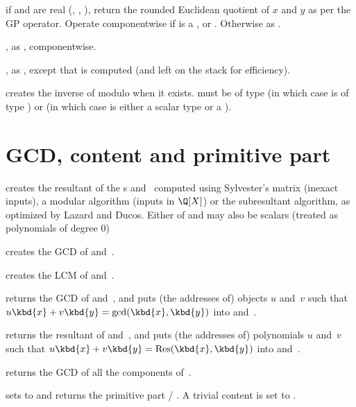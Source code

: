  if  and  are real
(, , ), return the rounded Euclidean quotient of
$x$ and $y$ as per the \kbd{\bs/} GP operator. Operate componentwise if
 is a ,  or . Otherwise as .

, as ,
componentwise.

, as , except that
 is computed (and left on the stack for efficiency).

 creates the inverse of  modulo 
when it exists.  must be of type  (in which case  is
of type ) or  (in which case  is either a scalar
type or a ).

\section{GCD, content and primitive part}


 creates the resultant of the s
 and~ computed using Sylvester's matrix (inexact inputs), a
modular algorithm (inputs in $\Q[X]$) or the subresultant algorithm, as
optimized by Lazard and Ducos. Either of  and  may also be
scalars (treated as polynomials of degree $0$)

 creates the GCD of  and~.

 creates the LCM of  and~.

 returns the GCD of 
and~, and puts (the addresses of) objects $u$ and~$v$ such that
$u\kbd{x}+v\kbd{y}=\gcd(\kbd{x},\kbd{y})$ into  and~.

 returns the resultant
of  and~, and puts (the addresses of) polynomials $u$ and~$v$
such that $u\kbd{x}+v\kbd{y}=\text{Res}(\kbd{x},\kbd{y})$ into 
and~.

 returns the GCD of all the components of~.

 sets  to 
and returns the primitive part  / . A trivial content is set to
.

